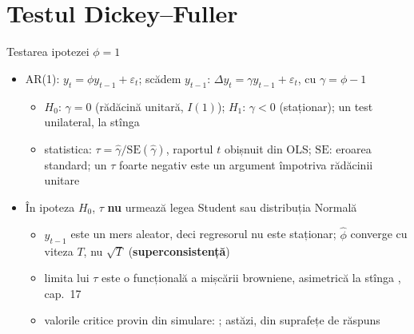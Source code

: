 \section{Testul Dickey--Fuller}

\begin{frame}{Testarea ipotezei $\phi = 1$}
\itemsize{\small}
\begin{itemize}
    \item AR(1): $y_t = \phi y_{t-1} + \varepsilon_t$; scădem $y_{t-1}$: $\Delta y_t = \gamma y_{t-1} + \varepsilon_t$, cu $\gamma = \phi - 1$
    \begin{itemize}
        \item $H_0$: $\gamma = 0$ (rădăcină unitară, $I(1)$); $H_1$: $\gamma < 0$ (staționar); un test unilateral, la stînga
        \item statistica: $\tau = \hat\gamma/\mathrm{SE}(\hat\gamma)$, raportul $t$ obișnuit din OLS; $\mathrm{SE}$: eroarea standard; un $\tau$ foarte negativ este un argument împotriva rădăcinii unitare
    \end{itemize}
    \item În ipoteza $H_0$, $\tau$ \textbf{nu} urmează legea Student sau distribuția Normală 
    \begin{itemize}
        \item $y_{t-1}$ este un mers aleator, deci regresorul nu este staționar; $\hat\phi$ converge cu viteza $T$, nu $\sqrt{T}$ (\textbf{superconsistență})
        \item limita lui $\tau$ este o funcțională a mișcării browniene, asimetrică la stînga , cap.~17
        \item valorile critice provin din simulare: ; astăzi, din suprafețe de răspuns 
    \end{itemize}
\end{itemize}
\end{frame}

